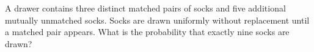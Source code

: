 A drawer contains three distinct matched pairs of socks and five additional mutually unmatched socks. Socks are drawn uniformly without replacement until a matched pair appears. What is the probability that exactly nine socks are drawn?
